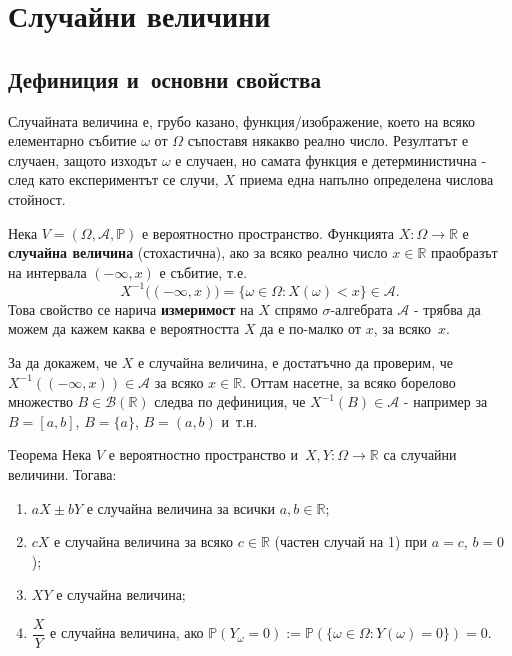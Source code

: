 \chapter{Случайни величини}

\section{Дефиниция и~основни свойства}

\begin{rembox}[Идея]
Случайната величина е, грубо казано, функция/изображение, което на
всяко елементарно събитие $\omega$ от $\Omega$ съпоставя някакво
реално число. Резултатът е случаен, защото изходът $\omega$ е
случаен, но самата функция е детерминистична - след като
експериментът се случи, $X$ приема една напълно определена числова
стойност.
\end{rembox}

\begin{defbox}
Нека $V=(\Omega,\mathcal{A},\mathbb{P})$ е вероятностно пространство.
Функцията $X:\Omega\to\mathbb{R}$ е \textbf{случайна величина}
(стохастична), ако за всяко реално число $x\in\mathbb{R}$
праобразът на интервала $(-\infty,x)$ е събитие, т.е.
\[
  X^{-1}\big((-\infty,x)\big) = \{\omega\in\Omega : X(\omega)<x\} \in \mathcal{A}.
\]
Това свойство се нарича \textbf{измеримост} на $X$ спрямо
$\sigma$-алгебрата $\mathcal{A}$ - трябва да можем да кажем каква е
вероятността $X$ да е по-малко от $x$, за всяко~$x$.
\end{defbox}

\begin{rembox}[Забележка]
За да докажем, че $X$ е случайна величина, е достатъчно да проверим,
че $X^{-1}((-\infty,x))\in\mathcal A$ за всяко $x\in\mathbb R$. Оттам
насетне, за всяко борелово множество $B\in\mathcal B(\mathbb R)$
следва по дефиниция, че $X^{-1}(B)\in\mathcal A$ - например за
$B=[a,b]$, $B=\{a\}$, $B=(a,b)$ и~т.н.
\end{rembox}

\begin{thmbox}{Теорема}
Нека $V$ е вероятностно пространство и~$X,Y:\Omega\to\mathbb R$ са
случайни величини. Тогава:
\begin{enumerate}[label=\arabic*)]
  \item $aX \pm bY$ е случайна величина за всички $a,b\in\mathbb R$;
  \item $cX$ е случайна величина за всяко $c\in\mathbb R$ (частен случай на 1) при $a=c$, $b=0$);
  \item $XY$ е случайна величина;
  \item $\dfrac{X}{Y}$ е случайна величина, ако $\mathbb P(Y_\omega{=}0):=\mathbb P(\{\omega\in\Omega:Y(\omega)=0\})=0$.
\end{enumerate}
\end{thmbox}

